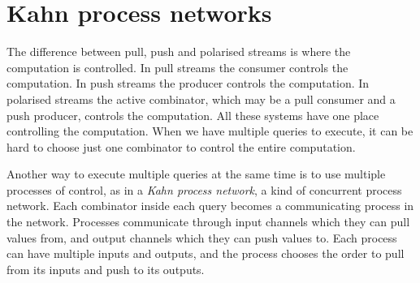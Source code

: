 % 
% 
% 
% 
% 

\section{Kahn process networks}

The difference between pull, push and polarised streams is where the computation is controlled.
In pull streams the consumer controls the computation.
In push streams the producer controls the computation.
In polarised streams the active combinator, which may be a pull consumer and a push producer, controls the computation.
All these systems have one place controlling the computation.
When we have multiple queries to execute, it can be hard to choose just one combinator to control the entire computation.

Another way to execute multiple queries at the same time is to use multiple processes of control, as in a \emph{Kahn process network}, a kind of concurrent process network.
Each combinator inside each query becomes a communicating process in the network.
Processes communicate through input channels which they can pull values from, and output channels which they can push values to.
Each process can have multiple inputs and outputs, and the process chooses the order to pull from its inputs and push to its outputs.

